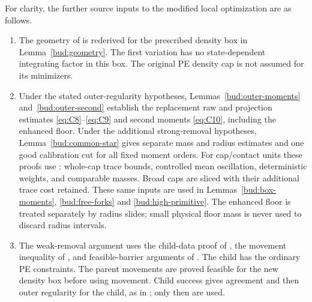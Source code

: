 For clarity, the further source inputs to the modified local optimization
are as follows.
\begin{enumerate}
\item The geometry of \cite[Lemma~3.3, equations~(9)--(10)]{PE} is
rederived for the prescribed density box in Lemma~\ref{bud:geometry}.
The first variation has no state-dependent integrating factor in this
box. The original PE density cap is not assumed for its minimizers.

\item Under the stated outer-regularity hypotheses,
Lemmas~\ref{bud:outer-moments} and~\ref{bud:outer-second} establish
the replacement raw and projection estimates \eqref{eq:C8}--\eqref{eq:C9}
and second moments \eqref{eq:C10}, including the enhanced floor.
Under the additional strong-removal hypotheses, Lemma~\ref{bud:common-star}
gives separate mass and radius estimates and one good calibration cut
for all fixed moment orders. For cap/contact
units these proofs use \cite[Lemmas~3.11--3.12, equations~(20)--(21)]{PE}:
whole-cap trace bounds, controlled mean oscillation, deterministic
weights, and comparable masses. Broad caps are sliced with their
additional trace cost retained. These same inputs are used in
Lemmas~\ref{bud:box-moments}, \ref{bud:free-forks} and
\ref{bud:high-primitive}. The enhanced floor is treated separately by
radius slides; small physical floor mass is never used to discard
radius intervals.

\item The weak-removal argument uses the child-data proof of
\cite[Lemma~6.2]{PE}, the movement inequality of
\cite[Lemma~6.3]{PE}, and feasible-barrier arguments of
\cite[Lemma~6.4]{PE}. The child has the ordinary PE constraints.
The parent movements are proved feasible for the new density box
before using movement. Child success gives agreement and then outer
regularity for the child, as in \cite[Lemma~6.5]{PE}; only then are
\cite[Theorem~5.1 and Proposition~5.9]{PE} used.


\end{enumerate}
